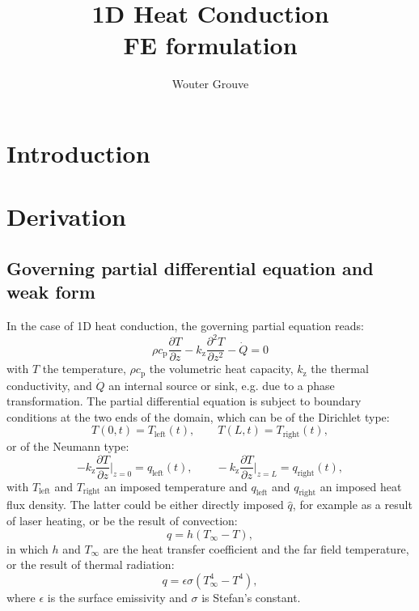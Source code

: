 \documentclass[10pt, a4paper, twoside, headinclude,footinclude, BCOR5mm]{scrartcl}
\author{Wouter Grouve}
\date{}
\title{1D Heat Conduction\\\medskip
\large FE formulation}
\begin{document}
\maketitle


\section{Introduction}
\label{sec:org36ffbe6}


\section{Derivation}
\label{sec:orgfedd426}

\subsection{Governing partial differential equation and weak form}
\label{sec:org0f53657}

In the case of 1D heat conduction, the governing partial equation reads:
\begin{equation}
  \label{eq:pde}
  \rho c_\text{p}\frac{\partial T}{\partial z} -
  k_{\text{z}}\frac{\partial^2 T}{\partial z^2} -
  \dot{Q} = 0
\end{equation}
with \(T\) the temperature, \(\rho c_{\text{p}}\) the volumetric heat capacity, \(k_{\text{z}}\) the thermal conductivity, and \(\dot{Q}\) an internal  source or sink, e.g. due to a phase transformation. The partial differential equation is subject to boundary conditions at the two ends of the domain, which can be of the Dirichlet type:
\begin{equation*}
  T(0,t) = T_\text{left}(t), \qquad T(L,t) = T_\text{right}(t),
\end{equation*}
or of the Neumann type:
\begin{equation*}
  -k_{\text{z}}\frac{\partial T}{\partial z}\Biggr|_{z=0} = q_\text{left}(t), \qquad
  -k_{\text{z}}\frac{\partial T}{\partial z}\Biggr|_{z=L} = q_{\text{right}}(t),
\end{equation*}
with \(T_\text{left}\) and \(T_\text{right}\) an imposed temperature and \(q_\text{left}\) and \(q_\text{right}\) an imposed heat flux density. The latter could be either directly imposed \(\hat{q}\), for example as a result of laser heating, or be the result of convection:
\begin{equation*}
  q = h(T_{\infty}-T),
\end{equation*}
in which \(h\) and \(T_{\infty}\) are the heat transfer coefficient and the far field temperature, or the result of thermal radiation:
\begin{equation*}
  q = \epsilon\sigma(T_{\infty}^4-T^4),
\end{equation*}
where \(\epsilon\) is the surface emissivity and \(\sigma\) is Stefan's constant.
\end{document}
